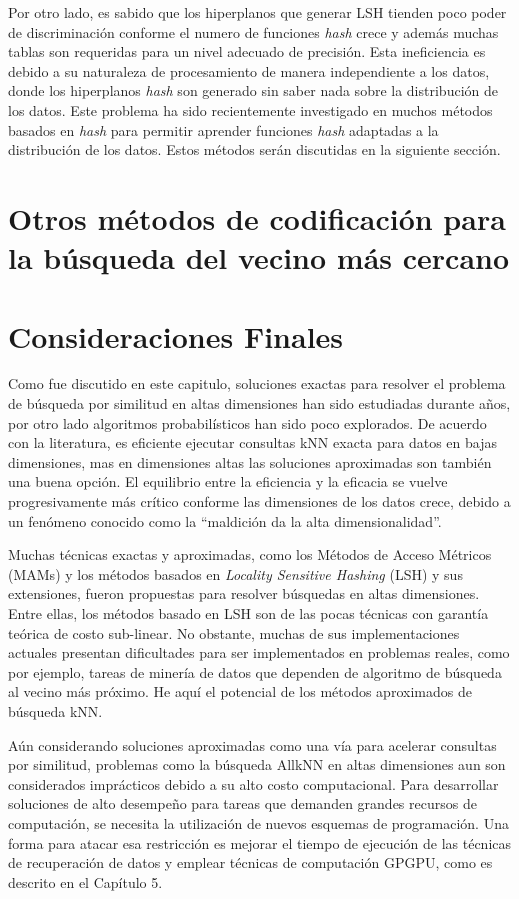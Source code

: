 Por otro lado, es  sabido que los hiperplanos que generar LSH tienden  poco  poder de discriminación conforme el numero de funciones \textit{hash} crece y además muchas tablas son requeridas para un nivel adecuado de precisión. Esta ineficiencia es debido a su naturaleza de procesamiento de manera independiente a los datos, donde los hiperplanos \textit{hash} son generado sin saber nada sobre la distribución de los datos.  Este problema  ha sido recientemente investigado en muchos métodos basados en \textit{hash} para permitir aprender funciones \textit{hash} adaptadas a la distribución de los datos. Estos métodos serán  discutidas en la siguiente sección. 

\section{Otros métodos de codificación  para la búsqueda del vecino más cercano}
 
 
 
\section{Consideraciones Finales}

Como fue discutido en este capitulo,  soluciones exactas para  resolver el problema de búsqueda por similitud en altas dimensiones han sido estudiadas durante años, por otro lado algoritmos probabilísticos han sido poco explorados. De acuerdo con la literatura, es eficiente ejecutar consultas kNN exacta para datos en bajas dimensiones, mas en dimensiones altas las soluciones aproximadas son también una buena opción. El equilibrio entre la eficiencia y la eficacia se vuelve progresivamente más crítico conforme las dimensiones de los datos crece, debido a un fenómeno conocido como   la ``maldición  da la alta dimensionalidad''.

Muchas técnicas exactas y aproximadas, como los Métodos de Acceso Métricos (MAMs) y los métodos basados en \textit{Locality Sensitive Hashing} (LSH) y sus extensiones, fueron propuestas para resolver búsquedas en altas dimensiones.  Entre ellas, los métodos basado en LSH son de las pocas técnicas con garantía teórica de costo sub-linear. No obstante, muchas de sus implementaciones actuales presentan dificultades para ser implementados en problemas reales, como por ejemplo, tareas de minería de datos que dependen de algoritmo de búsqueda al vecino más próximo. He aquí el potencial de los métodos aproximados de búsqueda kNN.

Aún considerando soluciones aproximadas como una vía para acelerar consultas por similitud, problemas como la búsqueda AllkNN en altas dimensiones aun son considerados imprácticos debido a su alto costo computacional. Para desarrollar soluciones de alto desempeño para tareas que demanden grandes recursos de computación, se necesita la utilización de nuevos esquemas de programación. Una forma para atacar esa restricción es mejorar el tiempo de ejecución de las técnicas de recuperación de datos y emplear técnicas de computación GPGPU, como es descrito en el Capítulo 5.

